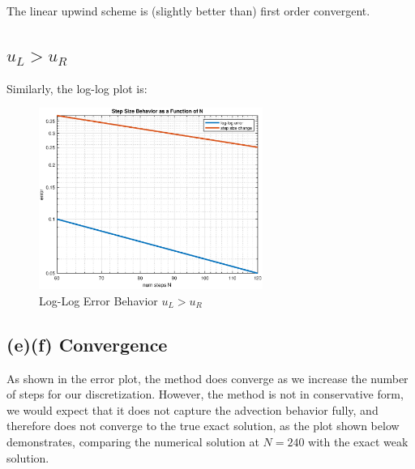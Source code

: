 \documentclass[12pt]{article} %
\begin{document}
The linear upwind scheme is (slightly better than) first order convergent.

\subsection{$u_L > u_R$}
Similarly, the log-log plot is:
\begin{figure}[h]
\caption{Log-Log Error Behavior $u_L>u_R$}
\centering
\includegraphics[width=0.65\textwidth]{1d_loglog2.eps}
\end{figure}

\subsection{(e)(f) Convergence}
\indent \indent As shown in the error plot, the method does converge as we increase the number of steps for our discretization. However, the method is not in conservative form, we would expect that it does not capture the advection behavior fully, and therefore does not converge to the true exact solution, as the plot shown below demonstrates, comparing the numerical solution at $N = 240$ with the exact weak solution. 
\end{document}
